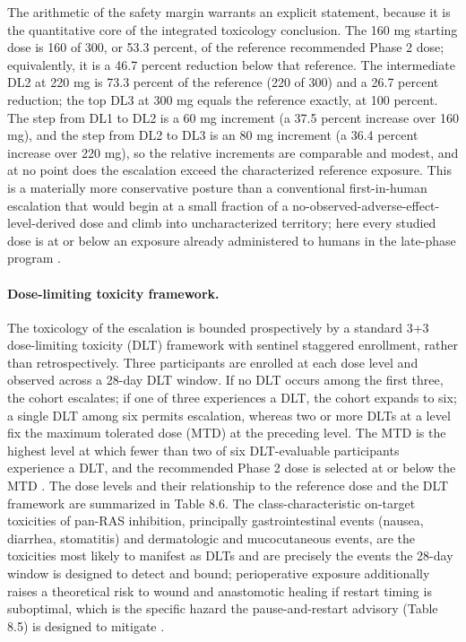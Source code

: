 The arithmetic of the safety margin warrants an explicit statement, because it is
the quantitative core of the integrated toxicology conclusion. The 160 mg starting
dose is 160 of 300, or 53.3 percent, of the reference recommended Phase 2 dose;
equivalently, it is a 46.7 percent reduction below that reference. The intermediate
DL2 at 220 mg is 73.3 percent of the reference (220 of 300) and a 26.7 percent
reduction; the top DL3 at 300 mg equals the reference exactly, at 100 percent. The
step from DL1 to DL2 is a 60 mg increment (a 37.5 percent increase over 160 mg),
and the step from DL2 to DL3 is an 80 mg increment (a 36.4 percent increase over
220 mg), so the relative increments are comparable and modest, and at no point does
the escalation exceed the characterized reference exposure. This is a materially
more conservative posture than a conventional first-in-human escalation that would
begin at a small fraction of a no-observed-adverse-effect-level-derived dose and
climb into uncharacterized territory; here every studied dose is at or below an
exposure already administered to humans in the late-phase program
\cite{daraxwhipple,phase1guidance}.

\paragraph{Dose-limiting toxicity framework.}
The toxicology of the escalation is bounded prospectively by a standard 3+3
dose-limiting toxicity (DLT) framework with sentinel staggered enrollment, rather
than retrospectively. Three participants are enrolled at each dose level and
observed across a 28-day DLT window. If no DLT occurs among the first three, the
cohort escalates; if one of three experiences a DLT, the cohort expands to six; a
single DLT among six permits escalation, whereas two or more DLTs at a level fix
the maximum tolerated dose (MTD) at the preceding level. The MTD is the highest
level at which fewer than two of six DLT-evaluable participants experience a DLT,
and the recommended Phase 2 dose is selected at or below the MTD
\cite{onpremwhippl}. The dose levels and their relationship to the reference
dose and the DLT framework are summarized in Table 8.6. The class-characteristic
on-target toxicities of pan-RAS inhibition, principally gastrointestinal events
(nausea, diarrhea, stomatitis) and dermatologic and mucocutaneous events, are
the toxicities most likely to manifest as DLTs and are precisely the events the
28-day window is designed to detect and bound; perioperative exposure
additionally raises a theoretical risk to wound and anastomotic healing if
restart timing is suboptimal, which is the specific hazard the pause-and-restart
advisory (Table 8.5) is designed to mitigate \cite{onpremwhippl}.


